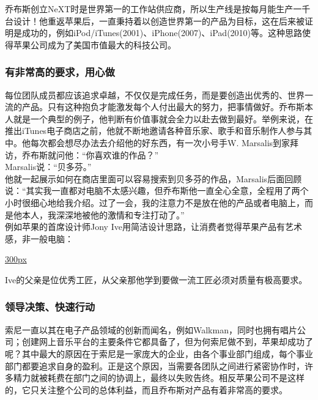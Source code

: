 乔布斯创立NeXT时是世界第一的工作站供应商，所以生产线是按每月能生产一千台设计！他重返苹果后，一直秉持着以创造世界第一的产品为目标，这在后来被证明是成功的，例如iPod/iTunes(2001)、iPhone(2007)、iPad(2010)等。这种思路使得苹果公司成为了美国市值最大的科技公司。\\

\hypertarget{ux6709ux975eux5e38ux9ad8ux7684ux8981ux6c42ux7528ux5fc3ux505a}{%
\subsubsection{有非常高的要求，用心做}\label{ux6709ux975eux5e38ux9ad8ux7684ux8981ux6c42ux7528ux5fc3ux505a}}

每位团队成员都应该追求卓越，不仅仅是完成任务，而是要创造出优秀的、世界一流的产品。只有这种抱负才能激发每个人付出最大的努力，把事情做好。乔布斯本人就是一个典型的例子，他判断有价值事就会全力以赴去做到最好。举例来说，在推出iTunes电子商店之前，他就不断地邀请各种音乐家、歌手和音乐制作人参与其中。他每次都会想尽办法去介绍他的好东西，有一次小号手W.
Marsalis到家拜访，乔布斯就问他：``你喜欢谁的作品？''\\
Marsalis说：``贝多芬。''\\
他就一起展示如何在商店里面可以容易搜索到贝多芬的作品，Marsalis后面回顾说：``其实我一直都对电脑不太感兴趣，但乔布斯他一直全心全意，全程用了两个小时很细心地给我介绍。过了一会，我的注意力不是放在他的产品或者电脑上，而是他本人，我深深地被他的激情和专注打动了。''\\
例如苹果的首席设计师Jony
Ive用简洁设计思路，让消费者觉得苹果产品有艺术感，非一般电脑：

\href{文件:R-C_副本.jpg}{300px}

Ive的父亲是位优秀工匠，从父亲那他学到要做一流工匠必须对质量有极高要求。

\hypertarget{ux9886ux5bfcux51b3ux7b56ux5febux901fux884cux52a8}{%
\subsubsection{领导决策、快速行动}\label{ux9886ux5bfcux51b3ux7b56ux5febux901fux884cux52a8}}

索尼一直以其在电子产品领域的创新而闻名，例如Walkman，同时也拥有唱片公司；创建网上音乐平台的主要条件它都具备了，但为何索尼做不到，苹果却成功了呢？其中最大的原因在于索尼是一家庞大的企业，由各个事业部门组成，每个事业部门都要追求自身的盈利。正是这个原因，当需要各团队之间进行紧密协作时，许多精力就被耗费在部门之间的协调上，最终以失败告终。相反苹果公司不是这样的，它只关注整个公司的总体利益，而且乔布斯对产品有着非常高的要求。

